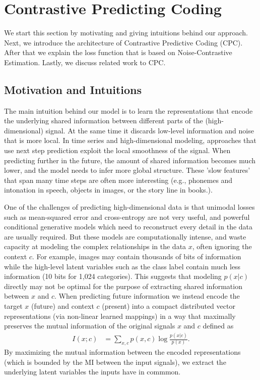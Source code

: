 \section{Contrastive Predicting Coding}
\label{method}

We start this section by motivating and giving intuitions behind our approach. Next, we introduce the architecture of Contrastive Predictive Coding (CPC). After that we explain the loss function that is based on Noise-Contrastive Estimation. Lastly, we discuss related work to CPC.

\subsection{Motivation and Intuitions}

The main intuition behind our model is to learn the representations that encode the underlying shared information between different parts of the (high-dimensional) signal. At the same time it discards low-level information and noise that is more local.
In time series and high-dimensional modeling, approaches that use next step prediction exploit the local smoothness of the signal.
When predicting further in the future, the amount of shared information becomes much lower, and the model needs to infer more global structure. These 'slow features' \cite{wiskott2002slow} that span many time steps are often more interesting (e.g., phonemes and intonation in speech, objects in images, or the story line in books.).

One of the challenges of predicting high-dimensional data is that unimodal losses such as mean-squared error and cross-entropy are not very useful, and powerful conditional generative models which need to reconstruct every detail in the data are usually required. But these models are computationally intense, and waste capacity at modeling the complex relationships in the data $x$, often ignoring the context $c$. For example, images may contain thousands of bits of information while the high-level latent variables such as the class label contain much less information (10 bits for 1,024 categories). This suggests that modeling $p(x|c)$ directly may not be optimal for the purpose of extracting shared information between $x$ and $c$. When predicting future information we instead encode the target $x$ (future) and context $c$ (present) into a compact distributed vector representations (via non-linear learned mappings) in a way that maximally preserves the mutual information of the original signals $x$ and $c$ defined as 
\begin{align}
I(x;c) &= \sum_{x,c} p(x,c) \log \frac{p(x|c)}{p(x)}. \label{mi}
\end{align}
By maximizing the mutual information between the encoded representations (which is bounded by the MI between the input signals), we extract the underlying latent variables the inputs have in commmon. 

